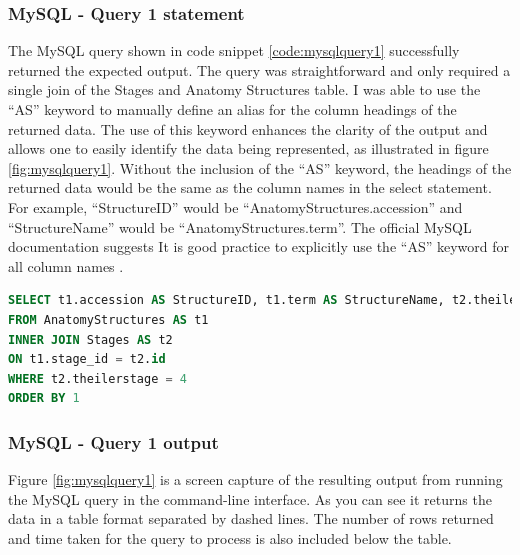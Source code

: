 \subsubsection*{MySQL - Query 1 statement}\label{mysqlquery1statement}
The MySQL query shown in code snippet \ref{code:mysqlquery1} successfully returned the expected output. The query was straightforward and only required a single join of the Stages and Anatomy Structures table. I was able to use the ``AS'' keyword to manually define an alias for the column headings of the returned data. The use of this keyword enhances the clarity of the output and allows one to easily identify the data being represented, as illustrated in figure \ref{fig:mysqlquery1}. Without the inclusion of the ``AS'' keyword, the headings of the returned data would be the same as the column names in the select statement. For example, ``StructureID'' would be ``AnatomyStructures.accession'' and ``StructureName'' would be ``AnatomyStructures.term''. The official MySQL documentation suggests It is good practice to explicitly use the ``AS'' keyword for all column names \cite{mysqlselectwebsite}.

\begin{lstlisting}[language=SQL, caption=MySQL Query 1 statement. All structures at Theiler Stage 4, label=code:mysqlquery1]
SELECT t1.accession AS StructureID, t1.term AS StructureName, t2.theilerstage AS TheilerStage, t2.dpc AS DPC
FROM AnatomyStructures AS t1
INNER JOIN Stages AS t2
ON t1.stage_id = t2.id
WHERE t2.theilerstage = 4
ORDER BY 1
\end{lstlisting}

\subsubsection*{MySQL - Query 1 output}\label{mysqlquery1output}
Figure \ref{fig:mysqlquery1} is a screen capture of the resulting output from running the MySQL query in the command-line interface. As you can see it returns the data in a table format separated by dashed lines. The number of rows returned and time taken for the query to process is also included below the table.

